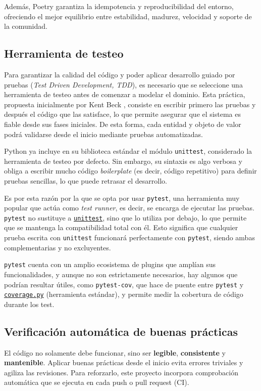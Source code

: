 Además, Poetry garantiza la idempotencia y reproducibilidad del entorno, ofreciendo el mejor equilibrio
entre estabilidad, madurez, velocidad y soporte de la comunidad.

\subsection{Herramienta de testeo} \label{sec:herramienta-testeo}
Para garantizar la calidad del código y poder aplicar desarrollo guiado por pruebas 
(\textit{Test Driven Development, TDD}), es necesario que se seleccione una herramienta de testeo antes de 
comenzar a modelar el dominio. Esta práctica, propuesta inicialmente por Kent Beck \cite{beckTDD}, 
consiste en escribir primero las pruebas y después el código que las satisface, lo que permite asegurar 
que el sistema es fiable desde sus fases iniciales. De esta forma, cada entidad y objeto de valor podrá 
validarse desde el inicio mediante pruebas automatizadas.

Python ya incluye en su biblioteca estándar el módulo \texttt{unittest}, considerado la herramienta
de testeo por defecto. Sin embargo, su sintaxis es algo verbosa y obliga a escribir mucho código
\textit{boilerplate} (es decir, código repetitivo) para definir pruebas sencillas, lo que puede 
retrasar el desarrollo.

Es por esta razón por la que se opta por usar \texttt{pytest}, una herramienta muy popular que actúa 
como \textit{test runner}, es decir, se encarga de ejecutar las pruebas. \texttt{pytest} no sustituye 
a \texttt{\href{https://docs.python.org/es/3/library/unittest.html}{unittest}}, sino que lo utiliza por 
debajo, lo que permite que se mantenga la compatibilidad total con él. Esto significa que cualquier 
prueba escrita con \texttt{unittest} funcionará perfectamente con \texttt{pytest}, siendo ambas 
complementarias y no excluyentes.

\texttt{pytest} cuenta con un amplio ecosistema de plugins que amplían sus funcionalidades, y aunque no son
estrictamente necesarios, hay algunos que podrían resultar útiles, como \texttt{pytest-cov}, que hace
de puente entre \texttt{pytest} y \texttt{\href{https://coverage.readthedocs.io/en/7.10.6/}{coverage.py}}
(herramienta estándar), y permite medir la cobertura de código durante los test.

\subsection{Verificación automática de buenas prácticas}
El código no solamente debe funcionar, sino ser \textbf{legible}, \textbf{consistente} y \textbf{mantenible}.
Aplicar buenas prácticas desde el inicio evita errores triviales y agiliza las revisiones. Para reforzarlo,
este proyecto incorpora comprobación automática que se ejecuta en cada push o pull request (CI).

